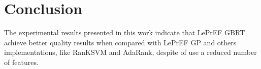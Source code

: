 \documentclass[preprint,12pt,3p]{elsarticle}
\begin{document}




\section{Conclusion}
The experimental results presented in this work indicate that LePrEF GBRT achieve better quality results when compared with LePrEF GP and others implementations, like RanKSVM and AdaRank, despite of use a reduced number of features. 

\label{conclusion}



% 
% 
% 
% 
% 
% 
% 
% 
% 
% 
% 
% 


\end{document}
